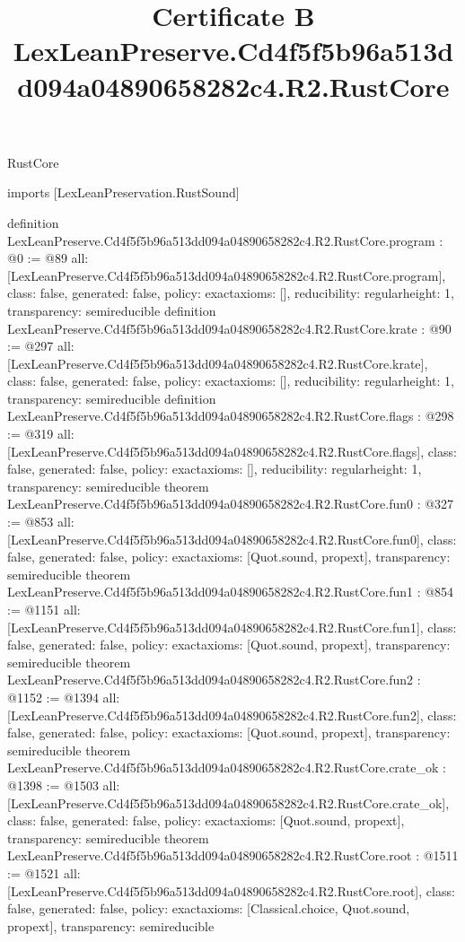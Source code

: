 \begin{lexlean}{RustCore}
\title{Certificate B LexLeanPreserve.Cd4f5f5b96a513dd094a04890658282c4.R2.RustCore}
\begin{coremodule}
imports [LexLeanPreservation.RustSound]

definition LexLeanPreserve.Cd4f5f5b96a513dd094a04890658282c4.R2.RustCore.program : @0 := @89 {
  all: [LexLeanPreserve.Cd4f5f5b96a513dd094a04890658282c4.R2.RustCore.program],
  class: false,
  generated: false,
  policy: exact{axioms: []},
  reducibility: regular{height: 1},
  transparency: semireducible
}
definition LexLeanPreserve.Cd4f5f5b96a513dd094a04890658282c4.R2.RustCore.krate : @90 := @297 {
  all: [LexLeanPreserve.Cd4f5f5b96a513dd094a04890658282c4.R2.RustCore.krate],
  class: false,
  generated: false,
  policy: exact{axioms: []},
  reducibility: regular{height: 1},
  transparency: semireducible
}
definition LexLeanPreserve.Cd4f5f5b96a513dd094a04890658282c4.R2.RustCore.flags : @298 := @319 {
  all: [LexLeanPreserve.Cd4f5f5b96a513dd094a04890658282c4.R2.RustCore.flags],
  class: false,
  generated: false,
  policy: exact{axioms: []},
  reducibility: regular{height: 1},
  transparency: semireducible
}
theorem LexLeanPreserve.Cd4f5f5b96a513dd094a04890658282c4.R2.RustCore.fun0 : @327 := @853 {
  all: [LexLeanPreserve.Cd4f5f5b96a513dd094a04890658282c4.R2.RustCore.fun0],
  class: false,
  generated: false,
  policy: exact{axioms: [Quot.sound, propext]},
  transparency: semireducible
}
theorem LexLeanPreserve.Cd4f5f5b96a513dd094a04890658282c4.R2.RustCore.fun1 : @854 := @1151 {
  all: [LexLeanPreserve.Cd4f5f5b96a513dd094a04890658282c4.R2.RustCore.fun1],
  class: false,
  generated: false,
  policy: exact{axioms: [Quot.sound, propext]},
  transparency: semireducible
}
theorem LexLeanPreserve.Cd4f5f5b96a513dd094a04890658282c4.R2.RustCore.fun2 : @1152 := @1394 {
  all: [LexLeanPreserve.Cd4f5f5b96a513dd094a04890658282c4.R2.RustCore.fun2],
  class: false,
  generated: false,
  policy: exact{axioms: [Quot.sound, propext]},
  transparency: semireducible
}
theorem LexLeanPreserve.Cd4f5f5b96a513dd094a04890658282c4.R2.RustCore.crate_ok : @1398 := @1503 {
  all: [LexLeanPreserve.Cd4f5f5b96a513dd094a04890658282c4.R2.RustCore.crate_ok],
  class: false,
  generated: false,
  policy: exact{axioms: [Quot.sound, propext]},
  transparency: semireducible
}
theorem LexLeanPreserve.Cd4f5f5b96a513dd094a04890658282c4.R2.RustCore.root : @1511 := @1521 {
  all: [LexLeanPreserve.Cd4f5f5b96a513dd094a04890658282c4.R2.RustCore.root],
  class: false,
  generated: false,
  policy: exact{axioms: [Classical.choice, Quot.sound, propext]},
  transparency: semireducible
}


\end{coremodule}
\end{lexlean}
